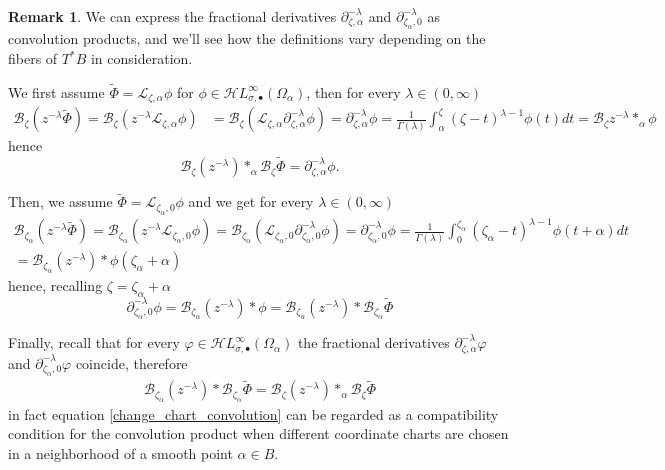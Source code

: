 \documentclass{article}
\newcommand{\singexp}[2]{\mathcal{H}L^\infty_{#1, #2}}
\newcommand{\singexpalg}[1]{\singexp{#1}{\bullet}}
\theoremstyle{definition}
\newcommand{\series}[1]{\tilde{#1}}
\newcommand{\fracderiv}[3]{\partial^{#1}_{#2, #3}}
\newcommand{\laplace}{\mathcal{L}}
\newcommand{\borel}{\mathcal{B}}
\newtheorem{remark}[definition]{Remark}
\begin{document}
\begin{remark}
We can express the fractional derivatives $\fracderiv{-\lambda}{\zeta}{\alpha}$ and $\fracderiv{-\lambda}{\zeta_\alpha}{0}$ as convolution products, and we’ll see how the definitions vary depending on the fibers of $T^*B$ in consideration. 

We first assume $\series{\Phi}=\laplace_{\zeta,\alpha}\phi$ for $\phi\in\singexpalg{\sigma}(\Omega_\alpha)$, then for every $\lambda\in (0,\infty)$
\begin{align*}
    \borel_\zeta(z^{-\lambda}\series{\Phi})=\borel_\zeta(z^{-\lambda}\laplace_{\zeta,\alpha}\phi)&=\borel_\zeta(\laplace_{\zeta,\alpha}\partial_{\zeta,\alpha}^{-\lambda}\phi)=\partial_{\zeta,\alpha}^{-\lambda}\phi=\frac{1}{\Gamma(\lambda)}\int_{\alpha}^\zeta (\zeta-t)^{\lambda-1}\phi(t)dt=\borel_\zeta z^{-\lambda}\ast_\alpha\phi
\end{align*}
hence \[\borel_\zeta (z^{-\lambda})\ast_\alpha\borel_\zeta\series{\Phi}=\fracderiv{-\lambda}{\zeta}{\alpha}\phi.\]

Then, we assume $\series{\Phi}=\laplace_{\zeta_\alpha,0}\phi$ and we get for every $\lambda\in (0,\infty)$
\begin{multline*}
    \borel_{\zeta_\alpha}(z^{-\lambda}\series{\Phi})=\borel_{\zeta_\alpha}(z^{-\lambda}\laplace_{\zeta_\alpha,0}\phi)=\borel_{\zeta_\alpha}(\laplace_{\zeta_\alpha,0}\partial_{\zeta_\alpha,0}^{-\lambda}\phi)=\partial_{\zeta_\alpha,0}^{-\lambda}\phi=\frac{1}{\Gamma(\lambda)}\int_{0}^{\zeta_\alpha} (\zeta_\alpha-t)^{\lambda-1}\phi(t+\alpha)dt\\
    =\borel_{\zeta_\alpha}(z^{-\lambda})\ast\phi(\zeta_\alpha+\alpha)
\end{multline*}
hence, recalling $\zeta=\zeta_\alpha+\alpha$ \[\partial_{\zeta_\alpha,0}^{-\lambda}\phi=\borel_{\zeta_\alpha} (z^{-\lambda})\ast\phi=\borel_{\zeta_\alpha} (z^{-\lambda})\ast\borel_{\zeta_\alpha}\series{\Phi}\]

Finally, recall that for every $\varphi\in\singexpalg{\sigma}(\Omega_\alpha)$ the fractional derivatives $\fracderiv{-\lambda}{\zeta}{\alpha}\varphi$ and 
$\fracderiv{-\lambda}{\zeta_\alpha}{0}\varphi$ coincide, therefore 
\begin{align}\label{change_chart_convolution}
    \borel_{\zeta_\alpha} (z^{-\lambda})\ast\borel_{\zeta_\alpha}\series{\Phi}=\borel_\zeta (z^{-\lambda})\ast_\alpha\borel_\zeta\series{\Phi}
\end{align}
in fact equation \eqref{change_chart_convolution} can be regarded as a compatibility condition for the convolution product when different coordinate charts are chosen in a neighborhood of a smooth point $\alpha\in B$.  
\end{remark}
\end{document}
